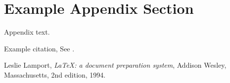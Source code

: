 \documentclass[final,1p,times,authoryear]{elsarticle}
\begin{document}
\appendix
\section{Example Appendix Section}
\label{app1}

Appendix text.

Example citation, See \citet{lamport94}.




\begin{thebibliography}{00}


  Leslie Lamport,
  \textit{\LaTeX: a document preparation system},
  Addison Wesley, Massachusetts,
  2nd edition,
  1994.

\end{thebibliography}
\end{document}
